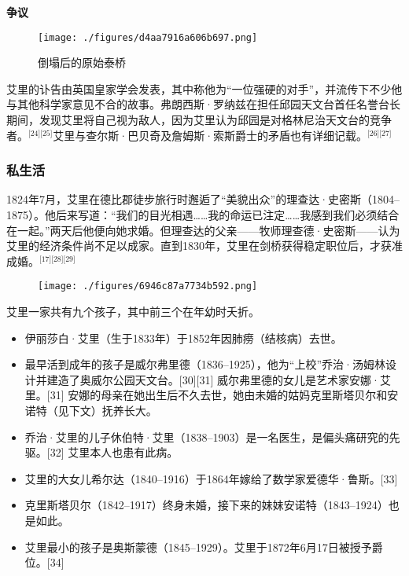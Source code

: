 \textbf{争议}
\begin{figure}[ht]
\centering
\texttt{[image: ./figures/d4aa7916a606b697.png]}
\caption{倒塌后的原始泰桥} \label{fig_AL_8}
\end{figure}
艾里的讣告由英国皇家学会发表，其中称他为“一位强硬的对手”，并流传下不少他与其他科学家意见不合的故事。弗朗西斯·罗纳兹在担任邱园天文台首任名誉台长期间，发现艾里将自己视为敌人，因为艾里认为邱园是对格林尼治天文台的竞争者。\(^\text{[24][25]}\)艾里与查尔斯·巴贝奇及詹姆斯·索斯爵士的矛盾也有详细记载。\(^\text{[26][27]}\)
\subsubsection{私生活}
1824年7月，艾里在德比郡徒步旅行时邂逅了“美貌出众”的理查达·史密斯（1804–1875）。他后来写道：“我们的目光相遇……我的命运已注定……我感到我们必须结合在一起。”两天后他便向她求婚。但理查达的父亲——牧师理查德·史密斯——认为艾里的经济条件尚不足以成家。直到1830年，艾里在剑桥获得稳定职位后，才获准成婚。\(^\text{[17][28][29]}\)
\begin{figure}[ht]
\centering
\texttt{[image: ./figures/6946c87a7734b592.png]}
\caption{} \label{fig_AL_9}
\end{figure}
艾里一家共有九个孩子，其中前三个在年幼时夭折。
\begin{itemize}
\item 伊丽莎白·艾里（生于1833年）于1852年因肺痨（结核病）去世。
\item 最早活到成年的孩子是威尔弗里德（1836–1925），他为“上校”乔治·汤姆林设计并建造了奥威尔公园天文台。[30][31] 威尔弗里德的女儿是艺术家安娜·艾里。[31] 安娜的母亲在她出生后不久去世，她由未婚的姑妈克里斯塔贝尔和安诺特（见下文）抚养长大。
\item 乔治·艾里的儿子休伯特·艾里（1838–1903）是一名医生，是偏头痛研究的先驱。[32] 艾里本人也患有此病。
\item 艾里的大女儿希尔达（1840–1916）于1864年嫁给了数学家爱德华·鲁斯。[33]
\item 克里斯塔贝尔（1842–1917）终身未婚，接下来的妹妹安诺特（1843–1924）也是如此。
\item 艾里最小的孩子是奥斯蒙德（1845–1929）。艾里于1872年6月17日被授予爵位。[34]
\end{itemize}